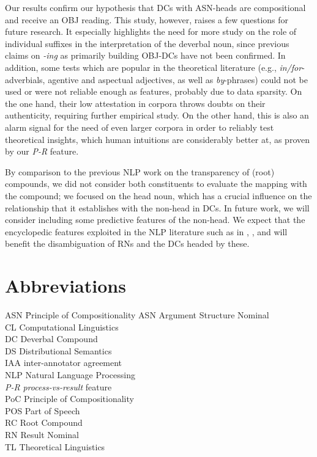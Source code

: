 \documentclass[output=paper]{langsci/langscibook}
\begin{document}
Our results confirm our hypothesis that DCs with ASN-heads are compositional and receive an OBJ reading. This study, however, raises a few questions for future research. It  especially highlights the need for more study on the role of individual suffixes in the interpretation of the deverbal noun, since previous claims on {\textit{-ing}} as primarily building OBJ-DCs have not been confirmed. 
In addition, some tests which are popular in the theoretical literature (e.g., \textit{in/for}-adverbials, agentive and aspectual adjectives, as well as \textit{by}-phrases) could not be used  or were not reliable enough as features, probably due to data sparsity.  On the one hand, their low attestation in corpora throws  doubts on their authenticity, requiring further empirical study. On the other hand, this is also an alarm signal for the need of even larger corpora in order to reliably test theoretical insights, which human intuitions are considerably better at, as proven by our \textit{P-R} feature.


By comparison to the previous NLP work on  {the transparency of (root)} compounds, we did not consider both constituents to evaluate the  mapping with the compound; we focused on the head noun, which  has a crucial influence on the relationship that it establishes with the non-head in DCs. In future work, we will consider including some predictive features of the non-head. We expect that the encyclopedic features exploited in the NLP literature such as in \cite{NicholsonBaldwin:06}, \cite{lapata:02}, and \cite{grover:lapata:lascarides:05} will benefit the disambiguation of RNs and the DCs headed by these. 

\section*{Abbreviations}
\begin{multicols}{2}
 \begin{tabbing}
 ASN\hspace{1em} \= Principle of Compositionality\kill
 ASN \> Argument Structure Nominal\\
 CL \> Computational Linguistics\\
 DC \> Deverbal Compound\\
 DS \> Distributional Semantics\\
 IAA \> inter-annotator agreement\\
 NLP \> Natural Language Processing\\
 \textit{P-R} \> \textit{process-vs-result} feature\\
 PoC \> Principle of Compositionality\\
 POS \> Part of Speech\\
 RC \> Root Compound\\
 RN \> Result Nominal\\
 TL \> Theoretical Linguistics
 \end{tabbing}
\end{multicols}
\end{document}
